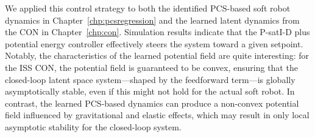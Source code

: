 We applied this control strategy to both the identified \gls{PCS}-based soft robot dynamics in Chapter~\ref{chp:pcsregression} and the learned latent dynamics from the \gls{CON} in Chapter~\ref{chp:con}. Simulation results indicate that the P-satI-D plus potential energy controller effectively steers the system toward a given setpoint. Notably, the characteristics of the learned potential field are quite interesting: for the \gls{ISS} \gls{CON}, the potential field is guaranteed to be convex, ensuring that the closed-loop latent space system—shaped by the feedforward term—is globally asymptotically stable, even if this might not hold for the actual soft robot. In contrast, the learned \gls{PCS}-based dynamics can produce a non-convex potential field influenced by gravitational and elastic effects, which may result in only local asymptotic stability for the closed-loop system.

